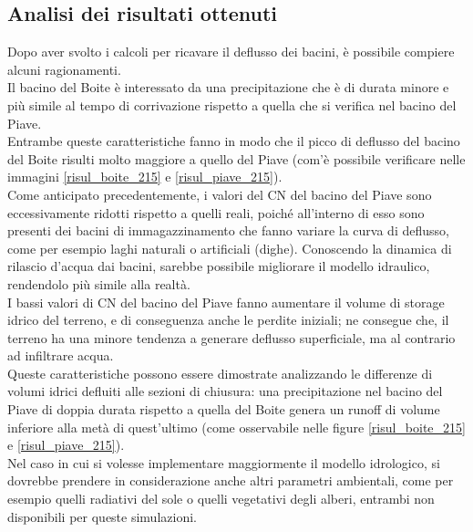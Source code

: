 \subsection{Analisi dei risultati ottenuti}
Dopo aver svolto i calcoli per ricavare il deflusso dei bacini, è possibile compiere alcuni ragionamenti.\\
Il bacino del Boite è interessato da una precipitazione che è di durata minore e più simile al tempo di corrivazione rispetto a quella che si verifica nel bacino del Piave.\\
Entrambe queste caratteristiche fanno in modo che il picco di deflusso del bacino del Boite risulti molto maggiore a quello del Piave (com'è possibile verificare nelle immagini \ref{risul_boite_215} e \ref{risul_piave_215}).\\
Come anticipato precedentemente, i valori del CN del bacino del Piave sono eccessivamente ridotti rispetto a quelli reali, poiché all'interno di esso sono presenti dei bacini di immagazzinamento che fanno variare la curva di deflusso, come per esempio laghi naturali o artificiali (dighe). Conoscendo la dinamica di rilascio d'acqua dai bacini, sarebbe possibile migliorare il modello idraulico, rendendolo più simile alla realtà.\\
I bassi valori di CN del bacino del Piave fanno aumentare il volume di storage idrico del terreno, e di conseguenza anche le perdite iniziali; ne consegue che, il terreno ha una minore tendenza a generare deflusso superficiale, ma al contrario ad infiltrare acqua.\\
Queste caratteristiche possono essere dimostrate analizzando le differenze di volumi idrici defluiti alle sezioni di chiusura: una precipitazione nel bacino del Piave di doppia durata rispetto a quella del Boite genera un runoff di volume inferiore alla metà di quest'ultimo (come osservabile nelle figure \ref{risul_boite_215} e \ref{risul_piave_215}).\\
Nel caso in cui si volesse implementare maggiormente il modello idrologico, si dovrebbe prendere in considerazione anche altri parametri ambientali, come per esempio quelli radiativi del sole o quelli vegetativi degli alberi, entrambi non disponibili per queste simulazioni.